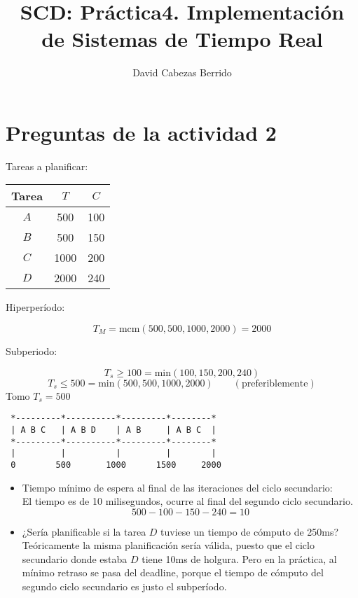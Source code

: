 \documentclass[12pt,spanish]{article}
\begin{document}
\title{SCD: Práctica4. Implementación de Sistemas de Tiempo Real}
\author{David Cabezas Berrido}
\date{\vspace{-5mm}}
\maketitle

\section*{Preguntas de la actividad 2}

Tareas a planificar:

\begin{table}[H]
  \centering
\begin{tabular}{|c|c|c|}
\hline
Tarea & $T$  & $C$ \\ \hline \hline
$A$   & 500  & 100 \\ \hline
$B$   & 500  & 150 \\ \hline
$C$   & 1000 & 200 \\ \hline
$D$   & 2000 & 240 \\ \hline
\end{tabular}
\end{table}

Hiperperíodo:

\[T_M=\text{mcm}(500,500,1000,2000) = 2000\]

Subperiodo:

\[T_s \geq 100=\text{min}(100,150,200,240)\]
\[T_s \leq 500=\text{min}(500,500,1000,2000) \qquad (\text{preferiblemente})\]
Tomo $T_s = 500$ 
\begin{verbatim}
 *---------*----------*---------*--------*
 | A B C   | A B D    | A B     | A B C  |
 *---------*----------*---------*--------*
 |         |          |         |        |
 0        500       1000      1500     2000
\end{verbatim}

\begin{itemize}
\item Tiempo mínimo de espera al final de las iteraciones del ciclo
  secundario: \\

  El tiempo es de 10 milisegundos, ocurre al final del segundo ciclo
  secundario.
  \[500-100-150-240=10\]

\item ¿Sería planificable si la tarea $D$ tuviese un tiempo de cómputo
  de 250ms? \\

  Teóricamente la misma planificación sería válida, puesto que el
  ciclo secundario donde estaba $D$ tiene 10ms de holgura. Pero en la
  práctica, al mínimo retraso se pasa del deadline, porque el
  tiempo de cómputo del segundo ciclo secundario es justo el
  subperíodo.
\end{itemize}
\end{document}
